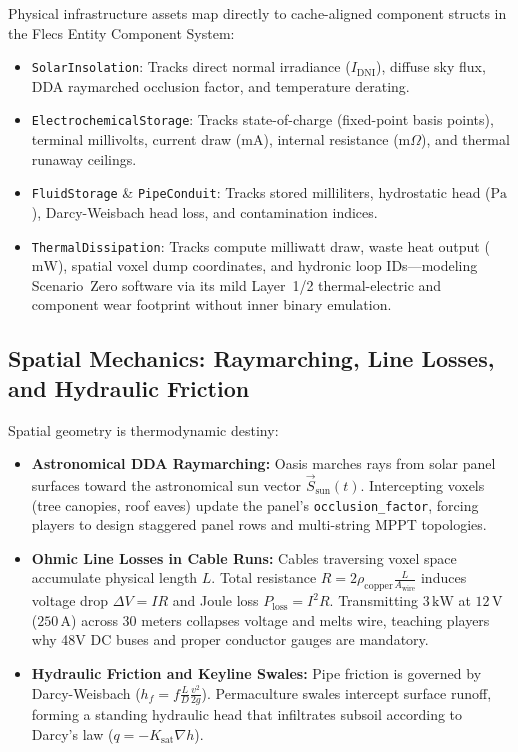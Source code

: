 Physical infrastructure assets map directly to cache-aligned component structs in the Flecs Entity Component System:
\begin{itemize}
    \item \texttt{SolarInsolation}: Tracks direct normal irradiance ($I_{\mathrm{DNI}}$), diffuse sky flux, DDA raymarched occlusion factor, and temperature derating.
    \item \texttt{ElectrochemicalStorage}: Tracks state-of-charge (fixed-point basis points), terminal millivolts, current draw ($\mathrm{mA}$), internal resistance ($\mathrm{m}\Omega$), and thermal runaway ceilings.
    \item \texttt{FluidStorage} \& \texttt{PipeConduit}: Tracks stored milliliters, hydrostatic head ($\mathrm{Pa}$), Darcy-Weisbach head loss, and contamination indices.
    \item \texttt{ThermalDissipation}: Tracks compute milliwatt draw, waste heat output ($\mathrm{mW}$), spatial voxel dump coordinates, and hydronic loop IDs---modeling Scenario~Zero software via its mild Layer~1/2 thermal-electric and component wear footprint without inner binary emulation.
\end{itemize}

\subsection{Spatial Mechanics: Raymarching, Line Losses, and Hydraulic Friction}

Spatial geometry is thermodynamic destiny:
\begin{itemize}
    \item \textbf{Astronomical DDA Raymarching:} Oasis marches rays from solar panel surfaces toward the astronomical sun vector $\vec{S}_{\mathrm{sun}}(t)$. Intercepting voxels (tree canopies, roof eaves) update the panel's \texttt{occlusion\_factor}, forcing players to design staggered panel rows and multi-string MPPT topologies.
    \item \textbf{Ohmic Line Losses in Cable Runs:} Cables traversing voxel space accumulate physical length $L$. Total resistance $R = 2 \rho_{\mathrm{copper}} \frac{L}{A_{\mathrm{wire}}}$ induces voltage drop $\Delta V = I R$ and Joule loss $P_{\mathrm{loss}} = I^2 R$. Transmitting $3\,\mathrm{kW}$ at $12\,\mathrm{V}$ ($250\,\mathrm{A}$) across 30 meters collapses voltage and melts wire, teaching players why 48V DC buses and proper conductor gauges are mandatory.
    \item \textbf{Hydraulic Friction and Keyline Swales:} Pipe friction is governed by Darcy-Weisbach ($h_f = f \frac{L}{D} \frac{v^2}{2g}$). Permaculture swales intercept surface runoff, forming a standing hydraulic head that infiltrates subsoil according to Darcy's law ($q = -K_{\mathrm{sat}} \nabla h$).
\end{itemize}

